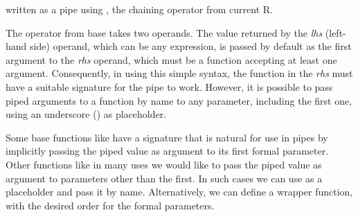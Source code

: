 \documentclass[krantz2]{krantz}\usepackage{knitr}
\begin{document}
written as a pipe using \Roperator{|>}, the chaining operator from current R.

\begin{knitrout}\footnotesize
{}\color{fgcolor}\begin{kframe}
\begin{alltt}
 \hlstd{() |>} \hlstd{()} \hlkwb{->} 
\end{alltt}
\end{kframe}
\end{knitrout}

\begin{explainbox}
The \Roperator{|>} operator from base \Rlang takes two operands. The value returned by the \emph{lhs} (left-hand side) operand, which can be any \Rlang expression, is passed by default as the first argument to the \emph{rhs} operand, which must be a function accepting at least one argument. Consequently, in using this simple syntax, the function in the \emph{rhs} must have a suitable signature for the pipe to work. However, it is possible to pass piped arguments to a function by name to any parameter, including the first one, using an underscore (\code{\_}) as placeholder.

Some base \Rlang functions like  have a signature that is natural for use in pipes by implicitly passing the piped value as argument to its first formal parameter. Other functions like  in many uses we would like to pass the piped value as argument to parameters other than the first. In such cases we can use \code{\_} as a placeholder and pass it by name. Alternatively, we can define a wrapper function, with the desired order for the formal parameters.

\begin{knitrout}\footnotesize
{}\color{fgcolor}\begin{kframe}
\begin{alltt}
 \hlkwb{<-} \hlstd{(}\hlstd{,} \hlstd{,} \hlstd{) \{}
  \hlstd{(}   
\hlstd{\}}
\end{alltt}
\end{kframe}
\end{knitrout}

\end{explainbox}
\end{document}
